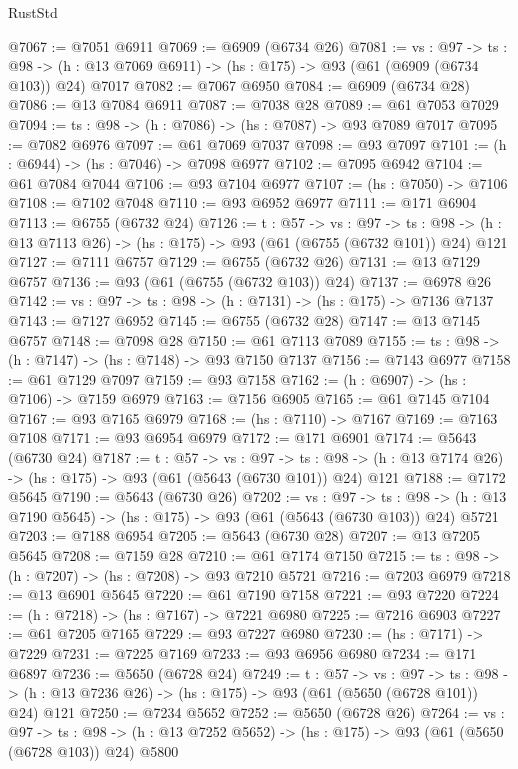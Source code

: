 \begin{lexlean}{RustStd}
\begin{coremodule}
@7067 := @7051 @6911
@7069 := @6909 (@6734 @26)
@7081 := {vs : @97} ->
  {ts : @98} -> (h : @13 @7069 @6911) -> (hs : @175) -> @93 (@61 (@6909 (@6734 @103)) @24) @7017
@7082 := @7067 @6950
@7084 := @6909 (@6734 @28)
@7086 := @13 @7084 @6911
@7087 := @7038 @28
@7089 := @61 @7053 @7029
@7094 := {ts : @98} -> (h : @7086) -> (hs : @7087) -> @93 @7089 @7017
@7095 := @7082 @6976
@7097 := @61 @7069 @7037
@7098 := @93 @7097
@7101 := (h : @6944) -> (hs : @7046) -> @7098 @6977
@7102 := @7095 @6942
@7104 := @61 @7084 @7044
@7106 := @93 @7104 @6977
@7107 := (hs : @7050) -> @7106
@7108 := @7102 @7048
@7110 := @93 @6952 @6977
@7111 := @171 @6904
@7113 := @6755 (@6732 @24)
@7126 := {t : @57} ->
  {vs : @97} ->
  {ts : @98} -> (h : @13 @7113 @26) -> (hs : @175) -> @93 (@61 (@6755 (@6732 @101)) @24) @121
@7127 := @7111 @6757
@7129 := @6755 (@6732 @26)
@7131 := @13 @7129 @6757
@7136 := @93 (@61 (@6755 (@6732 @103)) @24)
@7137 := @6978 @26
@7142 := {vs : @97} -> {ts : @98} -> (h : @7131) -> (hs : @175) -> @7136 @7137
@7143 := @7127 @6952
@7145 := @6755 (@6732 @28)
@7147 := @13 @7145 @6757
@7148 := @7098 @28
@7150 := @61 @7113 @7089
@7155 := {ts : @98} -> (h : @7147) -> (hs : @7148) -> @93 @7150 @7137
@7156 := @7143 @6977
@7158 := @61 @7129 @7097
@7159 := @93 @7158
@7162 := (h : @6907) -> (hs : @7106) -> @7159 @6979
@7163 := @7156 @6905
@7165 := @61 @7145 @7104
@7167 := @93 @7165 @6979
@7168 := (hs : @7110) -> @7167
@7169 := @7163 @7108
@7171 := @93 @6954 @6979
@7172 := @171 @6901
@7174 := @5643 (@6730 @24)
@7187 := {t : @57} ->
  {vs : @97} ->
  {ts : @98} -> (h : @13 @7174 @26) -> (hs : @175) -> @93 (@61 (@5643 (@6730 @101)) @24) @121
@7188 := @7172 @5645
@7190 := @5643 (@6730 @26)
@7202 := {vs : @97} ->
  {ts : @98} -> (h : @13 @7190 @5645) -> (hs : @175) -> @93 (@61 (@5643 (@6730 @103)) @24) @5721
@7203 := @7188 @6954
@7205 := @5643 (@6730 @28)
@7207 := @13 @7205 @5645
@7208 := @7159 @28
@7210 := @61 @7174 @7150
@7215 := {ts : @98} -> (h : @7207) -> (hs : @7208) -> @93 @7210 @5721
@7216 := @7203 @6979
@7218 := @13 @6901 @5645
@7220 := @61 @7190 @7158
@7221 := @93 @7220
@7224 := (h : @7218) -> (hs : @7167) -> @7221 @6980
@7225 := @7216 @6903
@7227 := @61 @7205 @7165
@7229 := @93 @7227 @6980
@7230 := (hs : @7171) -> @7229
@7231 := @7225 @7169
@7233 := @93 @6956 @6980
@7234 := @171 @6897
@7236 := @5650 (@6728 @24)
@7249 := {t : @57} ->
  {vs : @97} ->
  {ts : @98} -> (h : @13 @7236 @26) -> (hs : @175) -> @93 (@61 (@5650 (@6728 @101)) @24) @121
@7250 := @7234 @5652
@7252 := @5650 (@6728 @26)
@7264 := {vs : @97} ->
  {ts : @98} -> (h : @13 @7252 @5652) -> (hs : @175) -> @93 (@61 (@5650 (@6728 @103)) @24) @5800

\end{coremodule}
\end{lexlean}
